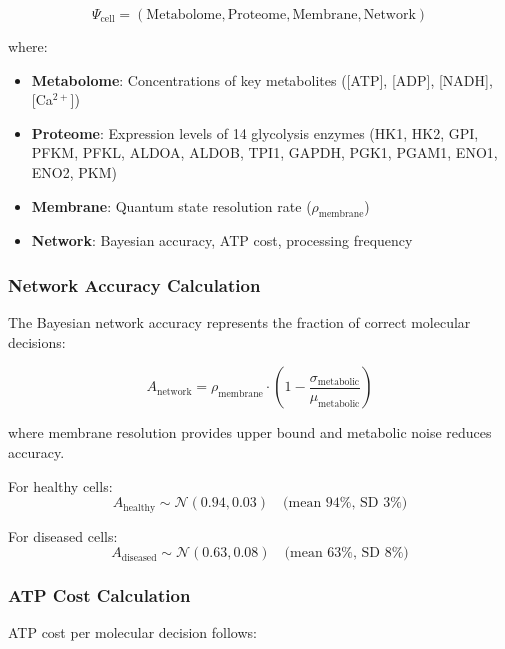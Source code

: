 \documentclass{article}
\begin{document}
\begin{equation}
\Psi_{\text{cell}} = (\text{Metabolome}, \text{Proteome}, \text{Membrane}, \text{Network})
\end{equation}

where:

\begin{itemize}
    \item \textbf{Metabolome}: Concentrations of key metabolites ([ATP], [ADP], [NADH], [Ca$^{2+}$])
    \item \textbf{Proteome}: Expression levels of 14 glycolysis enzymes (HK1, HK2, GPI, PFKM, PFKL, ALDOA, ALDOB, TPI1, GAPDH, PGK1, PGAM1, ENO1, ENO2, PKM)
    \item \textbf{Membrane}: Quantum state resolution rate ($\rho_{\text{membrane}}$)
    \item \textbf{Network}: Bayesian accuracy, ATP cost, processing frequency
\end{itemize}

\subsubsection{Network Accuracy Calculation}

The Bayesian network accuracy represents the fraction of correct molecular decisions:

\begin{equation}
A_{\text{network}} = \rho_{\text{membrane}} \cdot \left(1 - \frac{\sigma_{\text{metabolic}}}{\mu_{\text{metabolic}}}\right)
\end{equation}

where membrane resolution provides upper bound and metabolic noise reduces accuracy.

For healthy cells:
\begin{equation}
A_{\text{healthy}} \sim \mathcal{N}(0.94, 0.03) \quad \text{(mean 94\%, SD 3\%)}
\end{equation}

For diseased cells:
\begin{equation}
A_{\text{diseased}} \sim \mathcal{N}(0.63, 0.08) \quad \text{(mean 63\%, SD 8\%)}
\end{equation}

\subsubsection{ATP Cost Calculation}

ATP cost per molecular decision follows:
\end{document}
